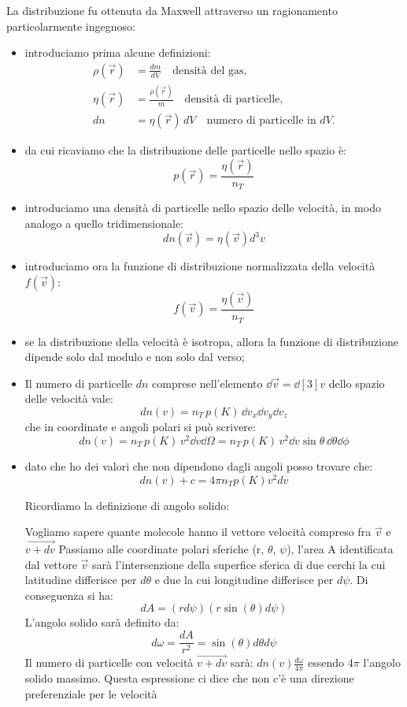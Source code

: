 \documentclass{article}
\theoremstyle{remark}
\begin{document}
La distribuzione fu ottenuta da Maxwell attraverso un ragionamento particolarmente ingegnoso:
\begin{itemize}
    \item introduciamo prima alcune definizioni:
    \begin{align*}
        \rho(\vec{r}) &= \frac{dm}{dV} \quad \text{densità del gas}, \\[6pt]
        \eta(\vec{r}) &= \frac{\rho(\vec{r})}{m} \quad \text{densità di particelle}, \\[6pt]
        dn &= \eta(\vec{r}) \, dV \quad \text{numero di particelle in } dV.
    \end{align*}
    \item da cui ricaviamo che la distribuzione delle particelle nello spazio è:
    \[ p(\vec{r})=\frac{\eta (\vec{r})}{n_T}\]
    \item introduciamo una densità di particelle nello spazio delle velocità, in modo analogo a quello tridimensionale: \[ dn(\vec{v})=\eta (\vec{v})d^3v\]
    \item introduciamo ora la funzione di distribuzione normalizzata della velocità $f(\vec{v})$: \[ f(\vec{v})=\frac{\eta (\vec{v})}{n_T}\]
    \item se la distribuzione della velocità è isotropa, allora la funzione di distribuzione dipende solo dal modulo e non solo dal verso;
    \item Il numero di particelle \( dn \) comprese nell'elemento \( \dd{\vec{v}} = \dd[3]{v} \) dello spazio delle velocità vale:
   \[
        dn(v) = n_T \, p(K) \, \dd{v_x} \dd{v_y} \dd{v_z}
    \]
    che in coordinate e angoli polari si può scrivere:
    \[
        dn(v) = n_T \, p(K) \, v^2 \dd{v} \dd{\Omega} = n_T \, p(K) \, v^2 \dd{v} \sin\theta \, \dd{\theta} \dd{\phi}
    \]
    \item dato che ho dei valori che non dipendono dagli angoli posso trovare che:
    \[
    dn(v)+c=4 \pi n_T p(K) v^2 dv 
    \]
\begin{nota}
    Ricordiamo la definizione di angolo solido:

    Vogliamo sapere quante molecole hanno il vettore velocità compreso fra $\vec{v}$ e $\vec{v+dv}$ Passiamo alle coordinate polari sferiche (r, $\theta$, $\psi$), l'area A identificata dal vettore $\vec{v}$
    sarà l'intersenzione della superfice sferica di due cerchi la cui latitudine differisce per $d\theta$ e due la cui longitudine differisce per $d\psi$. Di conseguenza si ha:
    \[
    dA=(rd\psi)(r\sin(\theta)d\psi)
    \]
    L'angolo solido sarà definito da:
    \[
    d\omega=\frac{dA}{r^2}=\sin(\theta)d\theta d\psi
    \]
    Il numero di particelle con velocità $\vec{v+dv}$ sarà: $dn(v)\frac{d\omega}{4\pi}$ essendo $4\pi$ l'angolo solido massimo. Questa espressione ci dice
    che non c'è una direzione preferenziale per le velocità


\end{nota}
\end{itemize}
\end{document}

